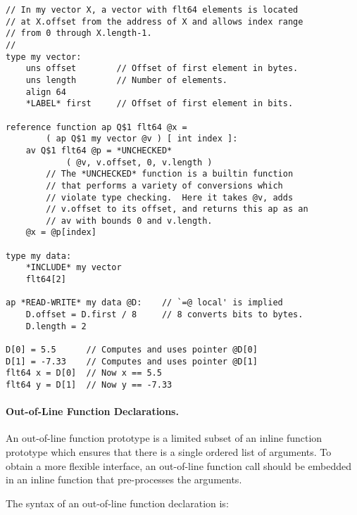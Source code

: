 \documentclass[12pt]{article}
\newcommand{\subsubsubsection}[1]{\paragraph[#1]{#1.}}
\newenvironment{indpar}[1][0.3in]%
	{\begin{list}{}%
		     {\setlength{\itemsep}{0in}%
		      \setlength{\topsep}{0in}%
		      \setlength{\parsep}{1ex}%
		      \setlength{\labelwidth}{#1}%
		      \setlength{\leftmargin}{#1}%
		      \addtolength{\leftmargin}{\labelsep}}%
	 \item}%
	{\end{list}}
\begin{document}
\begin{indpar}\label{REFERENCE-FUNCTION-EXAMPLE}\begin{verbatim}
// In my vector X, a vector with flt64 elements is located
// at X.offset from the address of X and allows index range
// from 0 through X.length-1.
//
type my vector:
    uns offset        // Offset of first element in bytes.
    uns length        // Number of elements.
    align 64
    *LABEL* first     // Offset of first element in bits.

reference function ap Q$1 flt64 @x =
        ( ap Q$1 my vector @v ) [ int index ]:
    av Q$1 flt64 @p = *UNCHECKED*
            ( @v, v.offset, 0, v.length )
        // The *UNCHECKED* function is a builtin function
        // that performs a variety of conversions which
        // violate type checking.  Here it takes @v, adds
        // v.offset to its offset, and returns this ap as an
        // av with bounds 0 and v.length.
    @x = @p[index]

type my data:
    *INCLUDE* my vector
    flt64[2]

ap *READ-WRITE* my data @D:    // `=@ local' is implied
    D.offset = D.first / 8     // 8 converts bits to bytes.
    D.length = 2

D[0] = 5.5      // Computes and uses pointer @D[0]
D[1] = -7.33    // Computes and uses pointer @D[1]
flt64 x = D[0]  // Now x == 5.5
flt64 y = D[1]  // Now y == -7.33
\end{verbatim}\end{indpar}


\subsubsubsection{Out-of-Line Function Declarations}
\label{OUT-OF-LINE-FUNCTION-DECLARATIONS}

An out-of-line function prototype is a limited subset of
an inline function prototype which ensures that there is
a single ordered list of arguments.  To obtain a more
flexible interface, an out-of-line function call should
be embedded in an inline function that pre-processes the
arguments.

The syntax of an out-of-line function declaration is:
\end{document}
